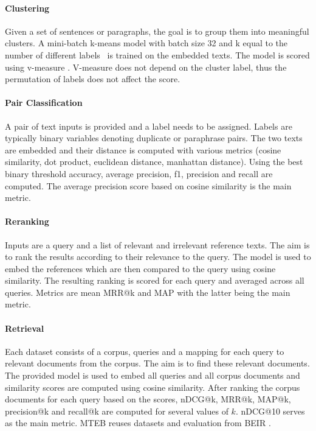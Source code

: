 \documentclass[11pt]{article}
\begin{document}
\paragraph{Clustering} Given a set of sentences or paragraphs, the goal is to group them into meaningful clusters. A mini-batch k-means model with batch size 32 and k equal to the number of different labels~\cite{scikit-learn} is trained on the embedded texts. The model is scored using v-measure \cite{vmeasure}. V-measure does not depend on the cluster label, thus the permutation of labels does not affect the score.

\paragraph{Pair Classification} A pair of text inputs is provided and a label needs to be assigned. Labels are typically binary variables denoting duplicate or paraphrase pairs. The two texts are embedded and their distance is computed with various metrics (cosine similarity, dot product, euclidean distance, manhattan distance). Using the best binary threshold accuracy, average precision, f1, precision and recall are computed. The average precision score based on cosine similarity is the main metric.

\paragraph{Reranking} Inputs are a query and a list of relevant and irrelevant reference texts. The aim is to rank the results according to their relevance to the query. The model is used to embed the references which are then compared to the query using cosine similarity. The resulting ranking is scored for each query and averaged across all queries. Metrics are mean MRR@k and MAP with the latter being the main metric.

\paragraph{Retrieval} Each dataset consists of a corpus, queries and a mapping for each query to relevant documents from the corpus. The aim is to find these relevant documents. The provided model is used to embed all queries and all corpus documents and similarity scores are computed using cosine similarity. After ranking the corpus documents for each query based on the scores, nDCG@k, MRR@k, MAP@k, precision@k and recall@k are computed for several values of $k$. nDCG@10 serves as the main metric. MTEB reuses datasets and evaluation from BEIR \cite{beir}.
\end{document}
